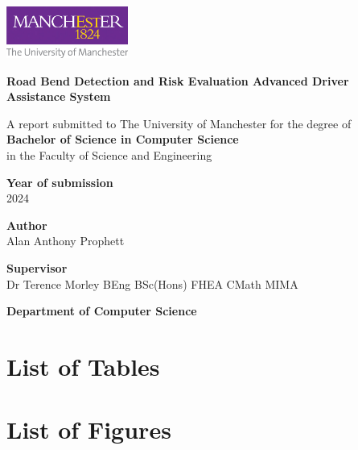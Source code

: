\documentclass[a4paper,11pt]{report}
\begin{document}
\begin{titlepage}
    \centering
    
    \includegraphics[width=0.3\textwidth]{images/uom_logo.jpg}\hfill
    \vspace{3cm}
    
    {\huge\bfseries Road Bend Detection and Risk Evaluation Advanced Driver Assistance System\par}
    \vspace{2cm}
    
    A report submitted to The University of Manchester for the degree of\\
    \textbf{Bachelor of Science in Computer Science}\\
    in the Faculty of Science and Engineering
    \vspace{2cm}
    
    \textbf{Year of submission}\\
    2024\par
    \vspace{2cm}
    
    \textbf{Author}\\
    Alan Anthony Prophett\par
    \vspace{2cm}
    
    \textbf{Supervisor}\\
    Dr Terence Morley BEng BSc(Hons) FHEA CMath MIMA
\par
    \vfill
    
    \textbf{Department of Computer Science}\par
    
\end{titlepage}

\tableofcontents

\newpage

\section*{List of Tables}

\section*{List of Figures}
\end{document}
